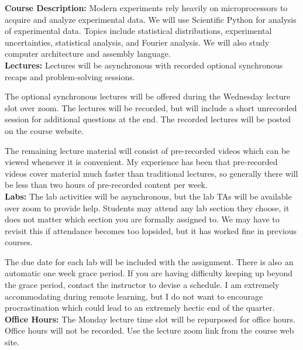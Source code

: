 \documentclass[12pt]{article}
\begin{document}
\noindent
\textbf {Course Description:}
Modern experiments rely heavily on microprocessors to acquire and
analyze experimental data.  We will use Scientific Python for analysis
of experimental data.  Topics include statistical distributions,
experimental uncertainties, statistical analysis, and Fourier
analysis.  We will also study computer architecture and assembly language.\\

\noindent
\textbf {Lectures:}
Lectures will be asynchronous with recorded optional synchronous
recaps and problem-solving sessions.

The optional synchronous lectures will be offered during the Wednesday
lecture slot over zoom.  The lectures will be recorded, but will
include a short unrecorded session for additional questions at the
end.  The recorded lectures will be posted on the course website.

The remaining lecture material will consist of pre-recorded videos
which can be viewed whenever it is convenient.  My experience has been
that pre-recorded videos cover material much faster than traditional
lectures, so generally there will be less than two hours of
pre-recorded content per week.\\

\noindent
\textbf {Labs:}
The lab activities will be asynchronous, but the lab TAs will be
available over zoom to provide help.  Students may attend any lab
section they choose, it does not matter which section you are formally
assigned to.  We may have to revisit this if attendance becomes too
lopsided, but it has worked fine in previous courses.

The due date for each lab will be included with the assignment.  There
is also an automatic one week grace period.  If you are having
difficulty keeping up beyond the grace period, contact the instructor
to devise a schedule.  I am extremely accommodating during remote
learning, but I do not want to encourage procrastination which could
lead to an extremely hectic end of the quarter.\\

\noindent
\textbf {Office Hours:}
The Monday lecture time slot will be repurposed for office hours.
Office hours will not be recorded.  Use the lecture zoom link from the course web site.\\


\end{document}

